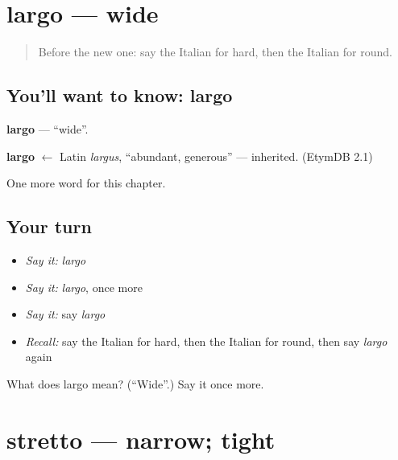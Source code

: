 \section[largo]{largo — wide}

\label{lesson:IT-C129-largo}



\begin{quote}
Before the new one: say the Italian for hard, then the Italian for round.
\end{quote}

\subsection*{You'll want to know: largo}
\textbf{largo} — \textquotedblleft{}wide\textquotedblright{}.

\begin{cousinweb}
\textbf{largo} $\leftarrow$ Latin \emph{largus}, \textquotedblleft{}abundant, generous\textquotedblright{} — inherited. (EtymDB 2.1)
\end{cousinweb}

\begin{grammarlens}[title={What you've built}]
One more word for this chapter.
\end{grammarlens}

\subsection*{Your turn}
\begin{itemize}
\raggedright
  \item \emph{Say it:} \emph{largo}
  \item \emph{Say it:} \emph{largo}, once more
  \item \emph{Say it:} say \emph{largo}
  \item \emph{Recall:} say the Italian for hard, then the Italian for round, then say \emph{largo} again
\end{itemize}

\begin{tcolorbox}[breakable,colback=teal!4,colframe=teal!35!black,title={Before you move on}]
What does largo mean? (\textquotedblleft{}Wide\textquotedblright{}.) Say it once more.
\end{tcolorbox}
\section[stretto]{stretto — narrow; tight}

